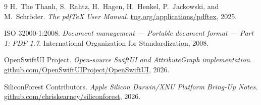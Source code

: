 \documentclass[10pt,twocolumn,letterpaper]{article}
\begin{document}
\begin{thebibliography}{9}
\scriptsize
{}
H.\ The Thanh, S.\ Rahtz, H.\ Hagen, H.\ Henkel, P.\ Jackowski, and M.\ Schr\"oder.
\emph{The pdf\TeX{} User Manual}.
\href{https://www.tug.org/applications/pdftex/}{tug.org/applications/pdftex}, 2025.

ISO 32000-1:2008.
\emph{Document management --- Portable document format --- Part 1: PDF 1.7}.
International Organization for Standardization, 2008.

OpenSwiftUI Project.
\emph{Open-source SwiftUI and AttributeGraph implementation}.
\href{https://github.com/OpenSwiftUIProject/OpenSwiftUI}{github.com/OpenSwiftUIProject/OpenSwiftUI}, 2026.

SiliconForest Contributors.
\emph{Apple Silicon Darwin/XNU Platform Bring-Up Notes}.
\href{https://github.com/chriskearney/siliconforest}{github.com/chriskearney/siliconforest}, 2026.
\end{thebibliography}
\end{document}
